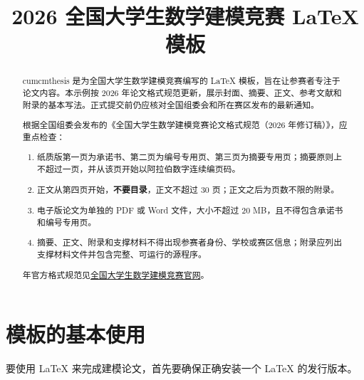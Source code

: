 \documentclass{cumcmthesis}
\title{2026 全国大学生数学建模竞赛 \LaTeX{} 模板}
\begin{document}
 \maketitle
 \begin{abstract}
cumcmthesis 是为全国大学生数学建模竞赛编写的 \LaTeX{} 模板，旨在让参赛者专注于论文内容。本示例按 2026 年论文格式规范更新，展示封面、摘要、正文、参考文献和附录的基本写法。正式提交前仍应核对全国组委会和所在赛区发布的最新通知。

\begin{mdframed} [%
	roundcorner=3pt,
	linecolor=gray!50,
	linewidth=0.35pt,
	backgroundcolor=gray!2,
innertopmargin=\topskip, frametitle={2026 年论文格式要点},
frametitlefont= \bfseries,frametitlerule=true,frametitlealignment =\raggedright\noindent,
frametitlerulewidth=.35pt, frametitlebackgroundcolor=gray!2,]
根据全国组委会发布的《全国大学生数学建模竞赛论文格式规范（2026 年修订稿）》，应重点检查：
\begin{enumerate}
\item 纸质版第一页为承诺书、第二页为编号专用页、第三页为摘要专用页；摘要原则上不超过一页，并从该页开始以阿拉伯数字连续编页码。
\item 正文从第四页开始，\textbf{\color{red}不要目录}，正文不超过 30 页；正文之后为页数不限的附录。
\item 电子版论文为单独的 PDF 或 Word 文件，大小不超过 20 MB，且不得包含承诺书和编号专用页。
\item 摘要、正文、附录和支撑材料不得出现参赛者身份、学校或赛区信息；附录应列出支撑材料文件并包含完整、可运行的源程序。
\end{enumerate}

\end{mdframed}


 年官方格式规范见\href{https://www.mcm.edu.cn/html_cn/node/4cd596519c9eb9fbd866398f6df0caa3.html}{全国大学生数学建模竞赛官网}。

\end{abstract}



\section{模板的基本使用}

要使用 \LaTeX{} 来完成建模论文，首先要确保正确安装一个 \LaTeX{} 的发行版本。
\end{document}
